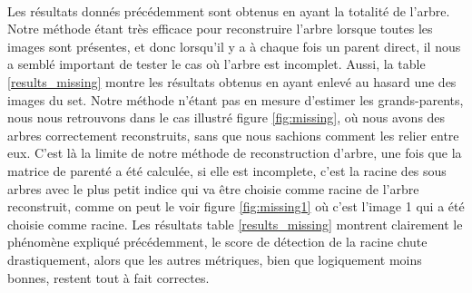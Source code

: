 \documentclass[utf8,final]{stageM2R} %
\begin{document}
\paragraph{}

Les résultats donnés précédemment sont obtenus en ayant la totalité de l'arbre. Notre méthode étant très efficace pour reconstruire l'arbre lorsque toutes les images sont présentes, et donc lorsqu'il y a à chaque fois un parent direct, il nous a semblé important de tester le cas où l'arbre est incomplet. Aussi, la table \ref{results_missing} montre les résultats obtenus en ayant enlevé au hasard une des images du set. Notre méthode n'étant pas en mesure d'estimer les grands-parents, nous nous retrouvons dans le cas illustré figure \ref{fig:missing}, où nous avons des arbres correctement reconstruits, sans que nous sachions comment les relier entre eux. C'est là la limite de notre méthode de reconstruction d'arbre, une fois que la matrice de parenté a été calculée, si elle est incomplete, c'est la racine des sous arbres avec le plus petit indice qui va être choisie comme racine de l'arbre reconstruit, comme on peut le voir figure \ref{fig:missing1} où c'est l'image 1 qui a été choisie comme racine. Les résultats table \ref{results_missing} montrent clairement le phénomène expliqué précédemment, le score de détection de la racine chute drastiquement, alors que les autres métriques, bien que logiquement moins bonnes, restent tout à fait correctes.
\end{document}

